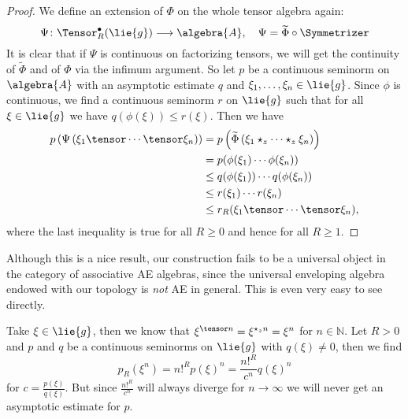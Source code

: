 \begin{proof}
    We define an extension of $\Phi$ on the whole tensor algebra
    again:
    \begin{equation*}
        \Psi \colon
        \Tensor_R^{\bullet}(\lie{g})
        \longrightarrow
        \algebra{A},
        \quad
        \Psi
        =
        \widetilde{\Phi} \circ \Symmetrizer
    \end{equation*}
    It is clear that if $\Psi$ is continuous on factorizing tensors,
    we will get the continuity of $\widetilde{\Phi}$ and of $\Phi$ via the
    infimum argument. So let $p$ be a continuous seminorm on
    $\algebra{A}$ with an asymptotic estimate $q$ and $\xi_1, \ldots,
    \xi_n \in \lie{g}$. Since $\phi$ is continuous, we find a
    continuous seminorm $r$ on $\lie{g}$ such that for all $\xi \in
    \lie{g}$ we have $q(\phi(\xi)) \leq r(\xi)$. Then we have
    \begin{align*}
        p \left(
        \Psi \left(
        \xi_1 \tensor \cdots \tensor \xi_n
        \right) \right)
        & =
        p \left(
        \widetilde{\Phi} \left(
        \xi_1 \star_z \cdots \star_z \xi_n
        \right) \right)
        \\
        & =
        p( \phi(\xi_1) \cdots \phi(\xi_n) )
        \\
        & \leq
        q( \phi(\xi_1) )
        \cdots
        q( \phi(\xi_n) )
        \\
        & \leq
        r(\xi_1) \cdots r(\xi_n)
        \\
        & \leq
        r_R(\xi_1 \tensor \cdots \tensor \xi_n),
    \end{align*}
    where the last inequality is true for all $R \geq 0$ and hence for all 
    $R \geq 1$.
\end{proof}
Although this is a nice result, our construction fails to be a universal object 
in the category of associative AE algebras, since the universal enveloping 
algebra endowed with our topology is \emph{not} AE in general. This is even 
very easy to see directly.
\begin{example}
    Take $\xi \in \lie{g}$, then we know that $\xi^{\tensor n} =
    \xi^{\ostar_z n} = \xi^n$ for $n \in \mathbb{N}$. 
    Let $R > 0$ and $p$ and $q$ be a continuous seminorms on $\lie{g}$ with 
    $q(\xi) \neq 0$, then we find
    \begin{equation}
        p_R(\xi^n)
        =
        n!^R p(\xi)^n
        =
        \frac{n!^R}{c^n} q(\xi)^n
    \end{equation}
    for $c = \frac{p(\xi)}{q(\xi)}$. But since $\frac{n!^R}{c^n}$ will always
    diverge for $n \rightarrow \infty$ we will never get an asymptotic
    estimate for $p$.
\end{example}
